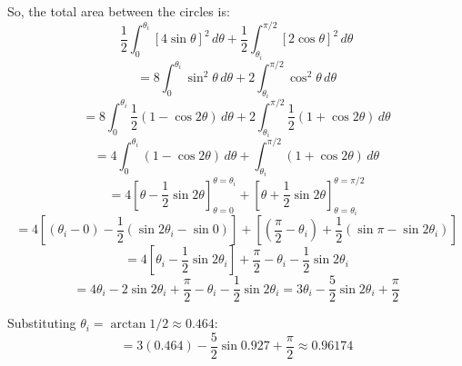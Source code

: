 \begin{Answer}[ref = polar5]
So, the total area between the circles is:
$$\frac{1}{2} \int_{0}^{\theta_i} \left[ 4\sin{\theta} \right]^2 \, d\theta + 
\frac{1}{2} \int_{\theta_i}^{\pi / 2} \left[ 2\cos{\theta} \right]^2 \, d
\theta$$
$$= 8 \int_{0}^{\theta_i} \sin^2{\theta} \, d\theta + 2 \int_{\theta_i}^{\pi / 
2} \cos^2{\theta} \, d\theta$$
$$= 8 \int_{0}^{\theta_i} \frac{1}{2} \left( 1 - \cos{2\theta} \right) \, d
\theta + 2 \int_{\theta_i}^{\pi / 2} \frac{1}{2} \left( 1 + \cos{2\theta} 
\right) \, d\theta$$
$$=4 \int_{0}^{\theta_i} \left( 1 - \cos{2\theta} \right) \, d\theta + \int_{
\theta_i}^{\pi / 2} \left( 1 + \cos{2\theta} \right) \, d\theta$$
$$= 4 \left[ \theta - \frac{1}{2} \sin{2\theta} \right]_{\theta = 0}^{\theta = 
\theta_i} + \left[ \theta + \frac{1}{2} \sin{2\theta} \right]_{\theta = \theta_
i}^{\theta = \pi / 2}$$
$$= 4 \left[ \left( \theta_i - 0 \right) - \frac{1}{2} \left( \sin{2\theta_i} -
\sin{0} \right) \right] + \left[ \left( \frac{\pi}{2} - \theta_i \right) + 
\frac{1}{2} \left( \sin{\pi} - \sin{2\theta_i} \right) \right]$$
$$= 4\left[ \theta_i - \frac{1}{2}\sin{2\theta_i} \right] + \frac{\pi}{2} - 
\theta_i - \frac{1}{2}\sin{2\theta_i}$$
$$= 4\theta_i - 2\sin{2\theta_i} + \frac{\pi}{2} - \theta_i - \frac{1}{2}\sin{
2\theta_i} = 3\theta_i - \frac{5}{2}\sin{2\theta_i} + \frac{\pi}{2}$$

Substituting $\theta_i = \arctan{1 / 2} \approx 0.464$:
$$= 3 (0.464) - \frac{5}{2}\sin{0.927} + \frac{\pi}{2} \approx 0.96174$$
\end{Answer}

